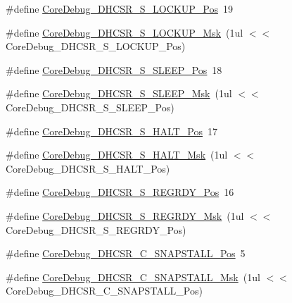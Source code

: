\begin{DoxyCompactItemize}
\item 
\#define \hyperlink{group___c_m_s_i_s___c_m3___core_debug_ga2900dd56a988a4ed27ad664d5642807e}{Core\+Debug\+\_\+\+D\+H\+C\+S\+R\+\_\+\+S\+\_\+\+L\+O\+C\+K\+U\+P\+\_\+\+Pos}~19
\item 
\#define \hyperlink{group___c_m_s_i_s___c_m3___core_debug_ga7b67e4506d7f464ef5dafd6219739756}{Core\+Debug\+\_\+\+D\+H\+C\+S\+R\+\_\+\+S\+\_\+\+L\+O\+C\+K\+U\+P\+\_\+\+Msk}~(1ul $<$$<$ Core\+Debug\+\_\+\+D\+H\+C\+S\+R\+\_\+\+S\+\_\+\+L\+O\+C\+K\+U\+P\+\_\+\+Pos)
\item 
\#define \hyperlink{group___c_m_s_i_s___c_m3___core_debug_ga349ccea33accc705595624c2d334fbcb}{Core\+Debug\+\_\+\+D\+H\+C\+S\+R\+\_\+\+S\+\_\+\+S\+L\+E\+E\+P\+\_\+\+Pos}~18
\item 
\#define \hyperlink{group___c_m_s_i_s___c_m3___core_debug_ga98d51538e645c2c1a422279cd85a0a25}{Core\+Debug\+\_\+\+D\+H\+C\+S\+R\+\_\+\+S\+\_\+\+S\+L\+E\+E\+P\+\_\+\+Msk}~(1ul $<$$<$ Core\+Debug\+\_\+\+D\+H\+C\+S\+R\+\_\+\+S\+\_\+\+S\+L\+E\+E\+P\+\_\+\+Pos)
\item 
\#define \hyperlink{group___c_m_s_i_s___c_m3___core_debug_ga760a9a0d7f39951dc3f07d01f1f64772}{Core\+Debug\+\_\+\+D\+H\+C\+S\+R\+\_\+\+S\+\_\+\+H\+A\+L\+T\+\_\+\+Pos}~17
\item 
\#define \hyperlink{group___c_m_s_i_s___c_m3___core_debug_ga9f881ade3151a73bc5b02b73fe6473ca}{Core\+Debug\+\_\+\+D\+H\+C\+S\+R\+\_\+\+S\+\_\+\+H\+A\+L\+T\+\_\+\+Msk}~(1ul $<$$<$ Core\+Debug\+\_\+\+D\+H\+C\+S\+R\+\_\+\+S\+\_\+\+H\+A\+L\+T\+\_\+\+Pos)
\item 
\#define \hyperlink{group___c_m_s_i_s___c_m3___core_debug_ga20a71871ca8768019c51168c70c3f41d}{Core\+Debug\+\_\+\+D\+H\+C\+S\+R\+\_\+\+S\+\_\+\+R\+E\+G\+R\+D\+Y\+\_\+\+Pos}~16
\item 
\#define \hyperlink{group___c_m_s_i_s___c_m3___core_debug_gac4cd6f3178de48f473d8903e8c847c07}{Core\+Debug\+\_\+\+D\+H\+C\+S\+R\+\_\+\+S\+\_\+\+R\+E\+G\+R\+D\+Y\+\_\+\+Msk}~(1ul $<$$<$ Core\+Debug\+\_\+\+D\+H\+C\+S\+R\+\_\+\+S\+\_\+\+R\+E\+G\+R\+D\+Y\+\_\+\+Pos)
\item 
\#define \hyperlink{group___c_m_s_i_s___c_m3___core_debug_ga85747214e2656df6b05ec72e4d22bd6d}{Core\+Debug\+\_\+\+D\+H\+C\+S\+R\+\_\+\+C\+\_\+\+S\+N\+A\+P\+S\+T\+A\+L\+L\+\_\+\+Pos}~5
\item 
\#define \hyperlink{group___c_m_s_i_s___c_m3___core_debug_ga53aa99b2e39a67622f3b9973e079c2b4}{Core\+Debug\+\_\+\+D\+H\+C\+S\+R\+\_\+\+C\+\_\+\+S\+N\+A\+P\+S\+T\+A\+L\+L\+\_\+\+Msk}~(1ul $<$$<$ Core\+Debug\+\_\+\+D\+H\+C\+S\+R\+\_\+\+C\+\_\+\+S\+N\+A\+P\+S\+T\+A\+L\+L\+\_\+\+Pos)
$$
\end{DoxyCompactItemize}
